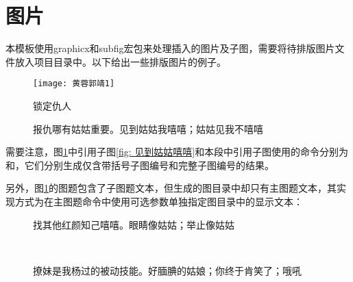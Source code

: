 \documentclass[print, doctor, vlined]{DissertUESTC}
\begin{document}
	\section{图片}
	
	本模板使用graphicx和subfig宏包来处理插入的图片及子图，需要将待排版图片文件放入项目目录中。以下给出一些排版图片的例子。
	
	\begin{figure}[!htb]
		\centering
		\texttt{[image: 黄蓉郭靖1]}
		\caption{锁定仇人}
	\end{figure}
	
	\clearpage
	\begin{figure}[!htb]
		\centering
		\hfill
		\caption[报仇哪有姑姑重要]{报仇哪有姑姑重要。见到姑姑我嘻嘻；姑姑见我不嘻嘻} \label{fig: 报仇哪有姑姑重要}
	\end{figure}
	

	需要注意，图\ref{fig: 报仇哪有姑姑重要}中引用子图\ref{fig: 见到姑姑嘻嘻}和本段中引用子图使用的命令分别为和，它们分别生成仅含带括号子图编号和完整子图编号的结果。
	
	另外，图\ref{fig: 报仇哪有姑姑重要}的图题包含了子图题文本，但生成的图目录中却只有主图题文本，其实现方式为在主图题命令中使用可选参数单独指定图目录中的显示文本：
	
	\begin{figure}[!htb]
		\centering
		\hfill
		\subfloat[]{
			\texttt{[image: 程英3]}
			\label{fig: 程英3}
		}
		\caption{找其他红颜知己嘻嘻。眼睛像姑姑；举止像姑姑} \label{fig: 红颜知己}
	\end{figure}
	
	\begin{figure}[!htb]
		\centering
		\subfloat[]{
			\texttt{[image: 绿萼2]}
			\label{fig: 绿萼2}
		}
		\hfill
		\\
		\caption{撩妹是我杨过的被动技能。好腼腆的姑娘；你终于肯笑了；哦吼} \label{fig: 被动技能}
	\end{figure}
\end{document}
